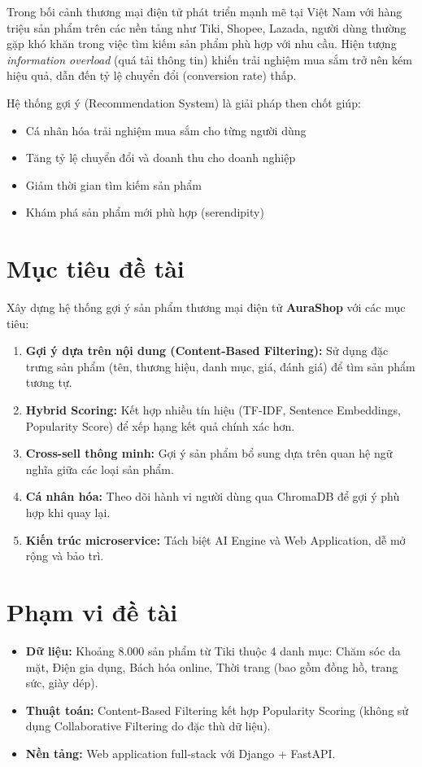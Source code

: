 \documentclass[12pt,a4paper]{report}
\begin{document}
Trong bối cảnh thương mại điện tử phát triển mạnh mẽ tại Việt Nam với hàng triệu sản phẩm trên các nền tảng như Tiki, Shopee, Lazada, người dùng thường gặp khó khăn trong việc tìm kiếm sản phẩm phù hợp với nhu cầu. Hiện tượng \textit{information overload} (quá tải thông tin) khiến trải nghiệm mua sắm trở nên kém hiệu quả, dẫn đến tỷ lệ chuyển đổi (conversion rate) thấp.

Hệ thống gợi ý (Recommendation System) là giải pháp then chốt giúp:
\begin{itemize}
    \item Cá nhân hóa trải nghiệm mua sắm cho từng người dùng
    \item Tăng tỷ lệ chuyển đổi và doanh thu cho doanh nghiệp
    \item Giảm thời gian tìm kiếm sản phẩm
    \item Khám phá sản phẩm mới phù hợp (serendipity)
\end{itemize}

\section{Mục tiêu đề tài}

Xây dựng hệ thống gợi ý sản phẩm thương mại điện tử \textbf{AuraShop} với các mục tiêu:

\begin{enumerate}
    \item \textbf{Gợi ý dựa trên nội dung (Content-Based Filtering):} Sử dụng đặc trưng sản phẩm (tên, thương hiệu, danh mục, giá, đánh giá) để tìm sản phẩm tương tự.
    \item \textbf{Hybrid Scoring:} Kết hợp nhiều tín hiệu (TF-IDF, Sentence Embeddings, Popularity Score) để xếp hạng kết quả chính xác hơn.
    \item \textbf{Cross-sell thông minh:} Gợi ý sản phẩm bổ sung dựa trên quan hệ ngữ nghĩa giữa các loại sản phẩm.
    \item \textbf{Cá nhân hóa:} Theo dõi hành vi người dùng qua ChromaDB để gợi ý phù hợp khi quay lại.
    \item \textbf{Kiến trúc microservice:} Tách biệt AI Engine và Web Application, dễ mở rộng và bảo trì.
\end{enumerate}

\section{Phạm vi đề tài}

\begin{itemize}
    \item \textbf{Dữ liệu:} Khoảng 8.000 sản phẩm từ Tiki thuộc 4 danh mục: Chăm sóc da mặt, Điện gia dụng, Bách hóa online, Thời trang (bao gồm đồng hồ, trang sức, giày dép).
    \item \textbf{Thuật toán:} Content-Based Filtering kết hợp Popularity Scoring (không sử dụng Collaborative Filtering do đặc thù dữ liệu).
    \item \textbf{Nền tảng:} Web application full-stack với Django + FastAPI.
\end{itemize}
\end{document}
